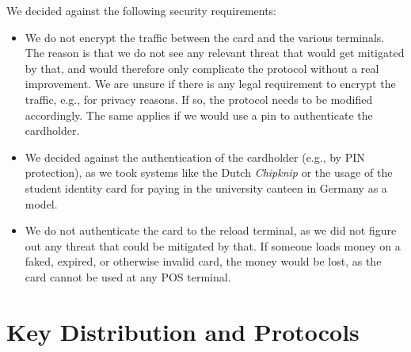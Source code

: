 \documentclass{article}
\begin{document}
We decided against the following security requirements:
\begin{itemize}
    \item We do not encrypt the traffic between the card and the various terminals.
    The reason is that we do not see any relevant threat that would get mitigated by that, and would therefore only complicate the protocol without a real improvement.
    We are unsure if there is any legal requirement to encrypt the traffic, e.g., for privacy reasons.
    If so, the protocol needs to be modified accordingly.
    The same applies if we would use a pin to authenticate the cardholder.
    
    \item We decided against the authentication of the cardholder (e.g., by PIN protection), as we took systems like the Dutch \emph{Chipknip} or the usage of the student identity card for paying in the university canteen in Germany as a model.

    \item We do not authenticate the card to the reload terminal, as we did not figure out any threat that could be mitigated by that.
    If someone loads money on a faked, expired, or otherwise invalid card, the money would be lost, as the card cannot be used at any POS terminal.
\end{itemize}


\section{Key Distribution and Protocols}
\end{document}

